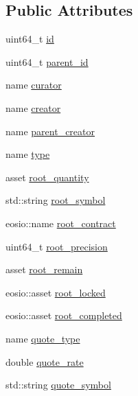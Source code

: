 \subsection*{Public Attributes}
\begin{DoxyCompactItemize}
\item 
uint64\+\_\+t \mbox{\hyperlink{structp2p_1_1orders_a128d2278d493599833f51e06310cdeb4}{id}}
\item 
uint64\+\_\+t \mbox{\hyperlink{structp2p_1_1orders_a587e23863136871fe42e47950037ae9c}{parent\+\_\+id}}
\item 
name \mbox{\hyperlink{structp2p_1_1orders_a3f36507a769c0ec66ca553722a842c2a}{curator}}
\item 
name \mbox{\hyperlink{structp2p_1_1orders_ae2b7e5411d8ddcd0e7c2be0fbb177686}{creator}}
\item 
name \mbox{\hyperlink{structp2p_1_1orders_aec4e15d60ed528fd396443cf448197aa}{parent\+\_\+creator}}
\item 
name \mbox{\hyperlink{structp2p_1_1orders_a60ac740af13940b35f388cb2c17c4f3a}{type}}
\item 
asset \mbox{\hyperlink{structp2p_1_1orders_ab805e2be0b457dbba918a014d792d84a}{root\+\_\+quantity}}
\item 
std\+::string \mbox{\hyperlink{structp2p_1_1orders_aa2030987fac872badf6682757cd75a6c}{root\+\_\+symbol}}
\item 
eosio\+::name \mbox{\hyperlink{structp2p_1_1orders_af0f8a3e55db6c2a7642eb25fdb4a4f50}{root\+\_\+contract}}
\item 
uint64\+\_\+t \mbox{\hyperlink{structp2p_1_1orders_a303fa40509f75981e8353d066898b837}{root\+\_\+precision}}
\item 
asset \mbox{\hyperlink{structp2p_1_1orders_aea7698baa46bbde12ec30bbb47be8abd}{root\+\_\+remain}}
\item 
eosio\+::asset \mbox{\hyperlink{structp2p_1_1orders_ab3e7388b2300e22f5b81678c6ccb70a7}{root\+\_\+locked}}
\item 
eosio\+::asset \mbox{\hyperlink{structp2p_1_1orders_aff1ea77bef5d251952e8d5e1f1dcfbc1}{root\+\_\+completed}}
\item 
name \mbox{\hyperlink{structp2p_1_1orders_ae2d706bd60dd6808b5d8d06cb584ca26}{quote\+\_\+type}}
\item 
double \mbox{\hyperlink{structp2p_1_1orders_a899228a1b7443c077096429aa5498224}{quote\+\_\+rate}}
\item 
std\+::string \mbox{\hyperlink{structp2p_1_1orders_ade50869ce026a09b486aff7dcd157d39}{quote\+\_\+symbol}}
\item 

\end{DoxyCompactItemize}
